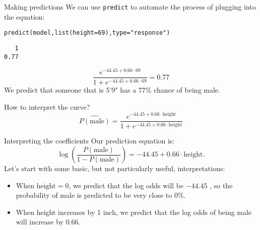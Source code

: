 \documentclass{beamer}\usepackage[]{graphicx}\usepackage[]{color}
\makeatletter
\newcommand{\hlnum}[1]{\textcolor[rgb]{0.824,0.412,0.118}{#1}}%
\newcommand{\hlstr}[1]{\textcolor[rgb]{1,0.894,0.71}{#1}}%
\newcommand{\hlstd}[1]{\textcolor[rgb]{1,0.894,0.769}{#1}}%
\newcommand{\hlkwc}[1]{\textcolor[rgb]{0.78,0.941,0.545}{#1}}%
\newcommand{\hlkwd}[1]{\textcolor[rgb]{1,0.78,0.769}{#1}}%
\newenvironment{kframe}{%
 \def\at@end@of@kframe{}%
 \ifinner\ifhmode%
  \def\at@end@of@kframe{\end{minipage}}%
  \begin{minipage}{\columnwidth}%
 \fi\fi%
 \def\FrameCommand##1{\hskip\@totalleftmargin \hskip-\fboxsep
 \colorbox{shadecolor}{##1}\hskip-\fboxsep
     \hskip-\linewidth \hskip-\@totalleftmargin \hskip\columnwidth}%
 \MakeFramed {\advance\hsize-\width
   \@totalleftmargin\z@ \linewidth\hsize
   \@setminipage}}%
 {\par\unskip\endMakeFramed%
 \at@end@of@kframe}
\newenvironment{knitrout}{}{} %
\makeatother
\begin{document}
\begin{darkframes}
    \begin{frame}[fragile]{Making predictions}
      We can use \texttt{predict} to automate the process of plugging into the equation:
\begin{knitrout}
\begin{kframe}
\begin{alltt}
\hlkwd{predict}\hlstd{(model,} \hlkwd{list}\hlstd{(}\hlkwc{height}\hlstd{=}\hlnum{69}\hlstd{),} \hlkwc{type}\hlstd{=}\hlstr{"response"}\hlstd{)}
\end{alltt}
\begin{verbatim}
   1 
0.77 
\end{verbatim}
\end{kframe}
\end{knitrout}
      
      \[
        \frac{e^{-44.45 + 0.66\cdot 69}}{1 + e^{-44.45 + 0.66\cdot 69}} = 0.77
      \]
      \pause
      We predict that someone that is 5'9" has a 77\% chance of being male.
    \end{frame}

    \begin{frame}[fragile]{How to interpret the curve?}
      \[
        \widehat{P(\text{male})} = \frac{e^{-44.45 + 0.66\cdot\text{height}}}{1 + e^{-44.45 + 0.66\cdot\text{height}}}
      \]
\begin{knitrout}


\end{knitrout}
    \end{frame}

    \begin{frame}{Interpreting the coefficients}
      Our prediction equation is:
      \[
        \log\left(\frac{P(\text{male})}{1-P(\text{male})}\right) = -44.45 + 0.66\cdot\text{height}.
      \]
      Let's start with some basic, but not particularly useful, interpretations:
      \begin{itemize}[<+->]
        \item When $\text{height}=0$, we predict that the log odds will be $-44.45$ \pause, so the probability of male is predicted to be very close to 0\%.
        \item When height increases by 1 inch, we predict that the log odds of being male will increase by $0.66$.
      \end{itemize}
    \end{frame}


\end{darkframes}
\end{document}
